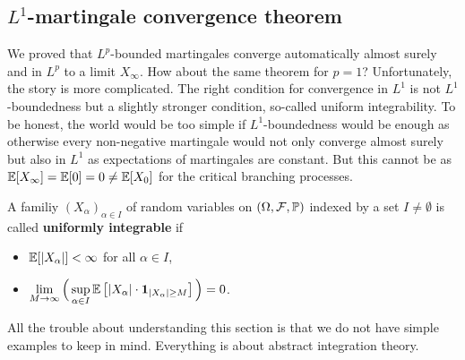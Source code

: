 \subsection{$L^1$-martingale convergence theorem}\label{secL1}
	\marginpar{\textcolor{red}{Lecture 8}}
	We proved that $L^p$-bounded martingales converge automatically almost surely and in $L^p$ to a limit $X_\infty$. How about the same theorem for $p=1$? Unfortunately, the story is more complicated. The right condition for convergence in $L^1$ is not $L^1$-boundedness but a slightly stronger condition, so-called uniform integrability. To be honest, the world would be too simple if $L^1$-boundedness would be enough as otherwise every non-negative martingale would not only converge almost surely but also in $L^1$ as expectations of martingales are constant. But this cannot be as $\mathbb{E}[X_\infty]=\mathbb{E}[0]=0\neq \mathbb{E}[X_0]$ for the critical branching processes.
\begin{ldef}
\begin{deff}
	A familiy $(X_{\alpha})_{\alpha \in I}$ of random variables on $(\Omega,\mathcal{F},\mathbb{P})$ indexed by a set $I\neq \emptyset$ is called \textbf{uniformly integrable} if
	\begin{itemize}
		\item
			$\mathbb{E}[\lvert X_\alpha \rvert]< \infty$  for all $\alpha \in I$,
		\item
			$\lim\limits_{M \to \infty}\Big( \sup\limits_{\alpha \in I} \mathbb{E}\left[ \lvert X_{\alpha}\rvert \cdot \mathbf 1_{\lvert X_{\alpha}\rvert \geq M }\right]\Big) = 0$.
	\end{itemize}
\end{deff}
\end{ldef}
All the trouble about understanding this section is that we do not have simple examples to keep in mind. Everything is about abstract integration theory.
